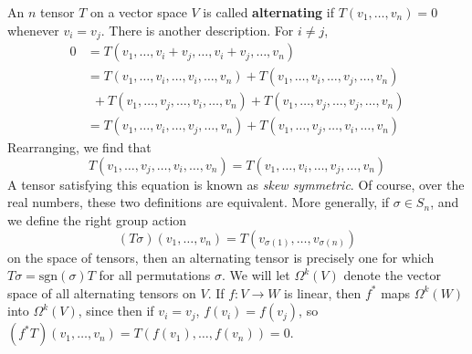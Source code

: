 An $n$ tensor $T$ on a vector space $V$ is called {\bf alternating} if $T(v_1, \dots, v_n) = 0$ whenever $v_i = v_j$. There is another description. For $i \neq j$,
%
\begin{align*}
    0 &= T(v_1, \dots, v_i + v_j, \dots, v_i + v_j, \dots, v_n)\\
    &= T(v_1, \dots, v_i, \dots, v_i, \dots, v_n) + T(v_1, \dots, v_i, \dots, v_j, \dots, v_n)\\
    &\ \ + T(v_1, \dots, v_j, \dots, v_i, \dots, v_n) + T(v_1, \dots, v_j, \dots, v_j, \dots, v_n)\\
    &= T(v_1, \dots, v_i, \dots, v_j, \dots, v_n) + T(v_1, \dots, v_j, \dots, v_i, \dots, v_n)
\end{align*}
%
Rearranging, we find that
%
\[ T(v_1, \dots, v_j, \dots, v_i, \dots, v_n) = T(v_1, \dots, v_i, \dots, v_j, \dots, v_n) \]
%
A tensor satisfying this equation is known as {\it skew symmetric}. Of course, over the real numbers, these two definitions are equivalent. More generally, if $\sigma \in S_n$, and we define the right group action
%
\[ (T \sigma)(v_1, \dots, v_n) = T(v_{\sigma(1)}, \dots, v_{\sigma(n)}) \]
%
on the space of tensors, then an alternating tensor is precisely one for which $T \sigma = \text{sgn}(\sigma) T$ for all permutations $\sigma$. We will let $\Omega^k(V)$ denote the vector space of all alternating tensors on $V$. If $f: V \to W$ is linear, then $f^*$ maps $\Omega^k(W)$ into $\Omega^k(V)$, since then if $v_i = v_j$, $f(v_i) = f(v_j)$, so $(f^* T)(v_1, \dots, v_n) = T(f(v_1), \dots, f(v_n)) = 0$.

